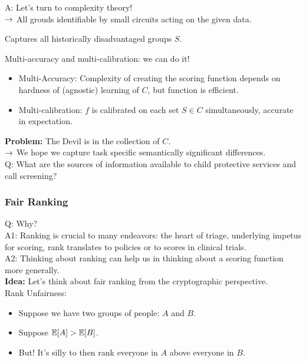 A: Let's turn to complexity theory! \\
$\rightarrow$ All grouds identifiable by small circuits acting on the given data.

\begin{conjecture}
Captures all historically disadvantaged groups $S$.
\end{conjecture}

Multi-accuracy and multi-calibration: we can do it!
\begin{itemize}
    \item Multi-Accuracy: Complexity of creating the scoring function depends on hardness of (agnostic) learning of $C$, but function is efficient.
    \item Multi-calibration: $f$ is calibrated on each set $S \in C$ simultaneously, accurate in expectation.
\end{itemize}

{\bf Problem:} The Devil is in the collection of $C$. \\

$\rightarrow$ We hope we capture task specific semantically significant differences. \\

Q: What are the sources of information available to child protective services and call screening?

\subsubsection{Fair Ranking}

Q: Why? \\

A1: Ranking is crucial to many endeavors: the heart of triage, underlying impetus for scoring, rank translates to policies or to scores in clinical trials.\\

A2: Thinking about ranking can help us in thinking about a scoring function more generally. \\

{\bf Idea:} Let's think about fair ranking from the cryptographic perspective. \\

Rank Unfairness:
\begin{itemize}
    \item Suppose we have two groups of people: $A$ and $B$.
    \item Suppose $\mathbb{E}[A] > \mathbb{E}[B]$.
    \item But! It's silly to then rank everyone in $A$ above everyone in $B$.
\end{itemize}

